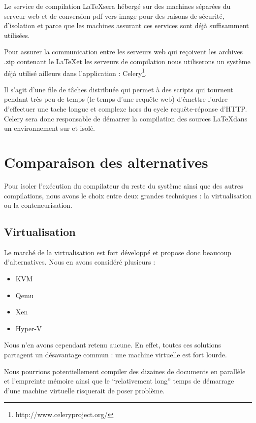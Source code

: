 \documentclass[10pt,a4paper]{article}
\begin{document}
Le service de compilation \LaTeX sera hébergé sur des machines séparées du serveur web et de conversion pdf vers image pour des raisons de sécurité, d'isolation et parce que les machines assurant ces services sont déjà suffisamment utilisées.

Pour assurer la communication entre les serveurs web qui reçoivent les archives .zip contenant le \LaTeX et les serveurs de compilation nous utiliserons un système déjà utilisé ailleurs dans l'application :
Celery\footnote{http://www.celeryproject.org/}.

Il s'agit d'une file de tâches distribuée qui permet à des scripts qui tournent pendant très peu de temps (le temps d'une requête web) d'émettre l'ordre d'effectuer une tache longue et complexe hors du cycle requête-réponse d'HTTP.
Celery sera donc responsable de démarrer la compilation des sources \LaTeX dans un environnement sur et isolé.



\section{Comparaison des alternatives}
Pour isoler l'exécution du compilateur du reste du système ainsi que des autres compilations, nous avons le choix entre deux grandes techniques : la virtualisation ou la conteneurisation.

\subsection{Virtualisation}

Le marché de la virtualisation est fort développé et propose donc beaucoup d'alternatives. Nous en avons considéré plusieurs :

\begin{itemize}
    \item{KVM}
    \item{Qemu}
    \item{Xen}
    \item{Hyper-V}
\end{itemize}

Nous n'en avons cependant retenu aucune. En effet, toutes ces solutions partagent un désavantage commun : une machine virtuelle est fort lourde.

Nous pourrions potentiellement compiler des dizaines de documents en parallèle et l'empreinte mémoire ainsi que le ``relativement long'' temps de démarrage d'une machine virtuelle risquerait de poser problème.
\end{document}
